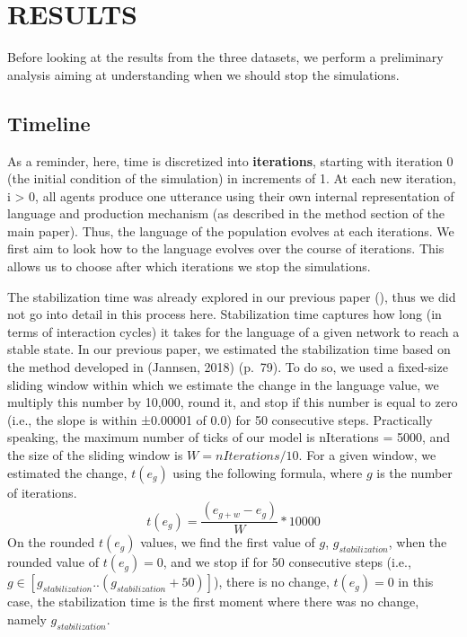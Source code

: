 \documentclass[
]{article}
\begin{document}
\hypertarget{results}{%
\section{RESULTS}\label{results}}

Before looking at the results from the three datasets, we perform a
preliminary analysis aiming at understanding when we should stop the
simulations.

\hypertarget{timeline}{%
\subsection{Timeline}\label{timeline}}

As a reminder, here, time is discretized into \textbf{iterations},
starting with iteration 0 (the initial condition of the simulation) in
increments of 1. At each new iteration, i \textgreater{} 0, all agents
produce one utterance using their own internal representation of
language and production mechanism (as described in the method section of
the main paper). Thus, the language of the population evolves at each
iterations. We first aim to look how to the language evolves over the
course of iterations. This allows us to choose after which iterations we
stop the simulations.

The stabilization time was already explored in our previous paper (),
thus we did not go into detail in this process here. Stabilization time
captures how long (in terms of interaction cycles) it takes for the
language of a given network to reach a stable state. In our previous
paper, we estimated the stabilization time based on the method developed
in (Jannsen, 2018) (p.~79). To do so, we used a fixed-size sliding
window within which we estimate the change in the language value, we
multiply this number by 10,000, round it, and stop if this number is
equal to zero (i.e., the slope is within ±0.00001 of 0.0) for 50
consecutive steps. Practically speaking, the maximum number of ticks of
our model is nIterations = 5000, and the size of the sliding window is
\(W = nIterations/10\). For a given window, we estimated the change,
\(t(e_g)\) using the following formula, where \(g\) is the number of
iterations. \[t(e_g)=\frac{(e_{g+w}-e_g)}{W}*10000\] On the rounded
\(t(e_g)\) values, we find the first value of \(g\),
\(g_{stabilization}\), when the rounded value of \(t(e_g) = 0\), and we
stop if for 50 consecutive steps (i.e.,
\(g \in [g_{stabilization}..(g_{stabilization}+50)]\)), there is no
change, \(t(e_g) = 0\) in this case, the stabilization time is the first
moment where there was no change, namely \(g_{stabilization}\).
\end{document}
